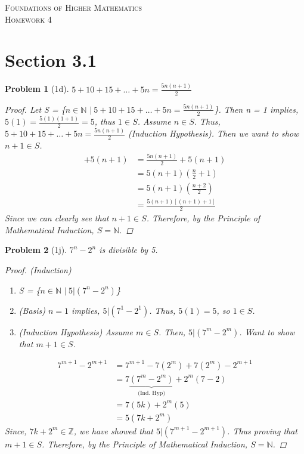 \documentclass{article}
\theoremstyle{problem}
\newtheorem{prob}{Problem}
\theoremstyle{plain}
\begin{document}
\begin{center}
\textsc{\Large Foundations of Higher Mathematics}\\[.3cm]
\textsc{\Large Homework 4}
\end{center}


\section*{Section 3.1}
\begin{prob}[1d]
  $5 + 10 + 15 + \ldots + 5n = \frac{5n(n + 1)}{2}$
  \begin{proof}
    Let S = \{$n \in \mathbb{N}$ $|\ 5 + 10 + 15 + \ldots + 5n = \frac{5n(n + 1)}{2}$\}.
    Then n = 1 implies, $5(1) = \frac{5(1)(1 + 1)}{2} = 5$, thus $1 \in S$.
    Assume $n \in S$. Thus, $5 + 10 + 15 + \ldots + 5n = \frac{5n(n + 1)}{2}$ (Induction Hypothesis). Then we want to show $n + 1 \in S$.      
    \begin{align*}
      [5 + 10 + 15 + \ldots + 5n] + 5(n + 1) &= \frac{5n(n + 1)}{2} + 5(n + 1) \tag*{(Induction hypothesis)}\\
      &= 5(n + 1)(\frac{n}{2} + 1)\\
      &= 5(n + 1)(\frac{n + 2}{2})\\
      &= \frac{5(n + 1)[(n+1) + 1]}{2}
    \end{align*}
    Since we can clearly see that $n + 1 \in S$. Therefore, by the Principle of Mathematical Induction, $S = \mathbb{N}$.
  \end{proof}
  \end{prob}
  \begin{prob}[1j]
    $7^n - 2^n$ is divisible by 5.
    \begin{proof}(Induction)
      \begin{enumerate}
      \item S = \{$n \in \mathbb{N}$ $|\ 5 | (7^n - 2^n)$\}
      \item (Basis) $n = 1$ implies, $5 | (7^1 - 2^1)$. Thus, $5(1) = 5$, so $1 \in S$.
      \item (Induction Hypothesis) Assume $m \in S$. Then, $5 | (7^m - 2^m)$. Want to show that $m + 1 \in S$.
      \end{enumerate}
      \begin{align*}
        7^{m+1} - 2^{m+1} &= 7^{m+1} -7(2^m) + 7(2^m) - 2^{m+1}\\
        &= 7\underbrace{(7^m - 2^m)}_{\text{(Ind. Hyp)}} + 2^m(7 - 2)\\
        &= 7(5k) + 2^m(5)\\
        &= 5(7k + 2^m)
      \end{align*}
      Since, $7k + 2^m \in \mathbb{Z}$, we have showed that $5 | (7^{m+1} - 2^{m+1})$. Thus proving that $m + 1 \in S$. Therefore, by the Principle of Mathematical Induction, $S = \mathbb{N}$.
    \end{proof}
  \end{prob}
 
\end{document}
